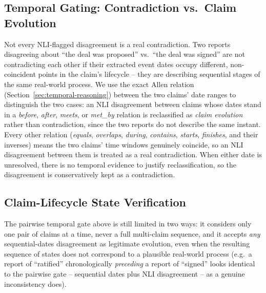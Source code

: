 \documentclass[conference]{IEEEtran}
\begin{document}
\subsection{Temporal Gating: Contradiction vs.\ Claim Evolution}

Not every NLI-flagged disagreement is a real contradiction. Two reports
disagreeing about ``the deal was proposed'' vs.\ ``the deal was signed''
are not contradicting each other if their extracted event dates occupy
different, non-coincident points in the claim's lifecycle -- they are
describing sequential stages of the same real-world process. We use the
exact Allen relation (Section~\ref{sec:temporal-reasoning}) between the two
claims' date ranges to distinguish the two cases: an NLI disagreement
between claims whose dates stand in a \emph{before}, \emph{after},
\emph{meets}, or \emph{met\_by} relation is reclassified as \emph{claim
evolution} rather than contradiction, since the two reports do not describe
the same instant. Every other relation (\emph{equals}, \emph{overlaps},
\emph{during}, \emph{contains}, \emph{starts}, \emph{finishes}, and their
inverses) means the two claims' time windows genuinely coincide, so an NLI
disagreement between them is treated as a real contradiction. When either
date is unresolved, there is no temporal evidence to justify reclassification,
so the disagreement is conservatively kept as a contradiction.

\subsection{Claim-Lifecycle State Verification}
\label{sec:lifecycle}

The pairwise temporal gate above is still limited in two ways: it considers
only one pair of claims at a time, never a full multi-claim sequence, and it
accepts \emph{any} sequential-dates disagreement as legitimate evolution,
even when the resulting sequence of states does not correspond to a
plausible real-world process (e.g.\ a report of ``ratified'' chronologically
\emph{preceding} a report of ``signed'' looks identical to the pairwise gate
-- sequential dates plus NLI disagreement -- as a genuine inconsistency does).
\end{document}
